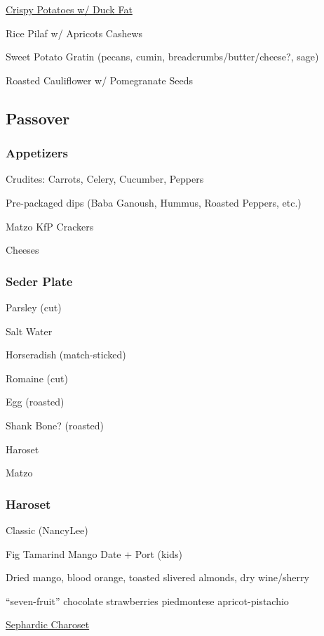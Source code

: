 \begin{centering}
 \href{http://www.seriouseats.com/recipes/2011/11/ultra-crispy-roast-potatoes-recipe.html}{Crispy Potatoes w/ Duck Fat}

 Rice Pilaf w/ Apricots \And Cashews

 Sweet Potato Gratin (pecans, cumin, breadcrumbs/butter/cheese?, sage)

 Roasted Cauliflower w/ Pomegranate Seeds

 \subsection*{Passover}

 \subsubsection*{Appetizers}
 Crudites: Carrots, Celery, Cucumber, Peppers

 Pre-packaged dips (Baba Ganoush, Hummus, Roasted Peppers, etc.)

 Matzo \And KfP Crackers

 Cheeses

 \subsubsection*{Seder Plate}
 Parsley (cut)

 Salt Water

 Horseradish (match-sticked)

 Romaine (cut)

 Egg (roasted)

 Shank Bone? (roasted)

 Haroset

 Matzo

 \subsubsection*{Haroset}
 Classic (NancyLee)

 Fig \blt Tamarind \blt Mango \blt Date + Port (kids)

 Dried mango, blood orange, toasted slivered almonds, dry wine/sherry

 “seven-fruit” \blt chocolate \And strawberries \blt piedmontese \blt apricot-pistachio

 \href{https://www.seriouseats.com/2012/04/how-to-make-sephardic-charoset-haroset-dried-fruit-recipe-passover.html}{Sephardic Charoset}


\end{centering}
